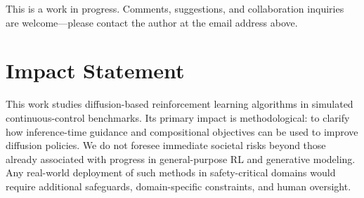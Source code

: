 \documentclass{article}
\theoremstyle{plain}
\theoremstyle{definition}
\theoremstyle{remark}
\begin{document}
This is a work in progress.
Comments, suggestions, and collaboration inquiries are welcome---please contact the author at the email address above.

\section*{Impact Statement}

This work studies diffusion-based reinforcement learning algorithms in simulated continuous-control benchmarks.
Its primary impact is methodological: to clarify how inference-time guidance and compositional objectives can be used to improve diffusion policies.
We do not foresee immediate societal risks beyond those already associated with progress in general-purpose RL and generative modeling.
Any real-world deployment of such methods in safety-critical domains would require additional safeguards, domain-specific constraints, and human oversight.



\end{document}

